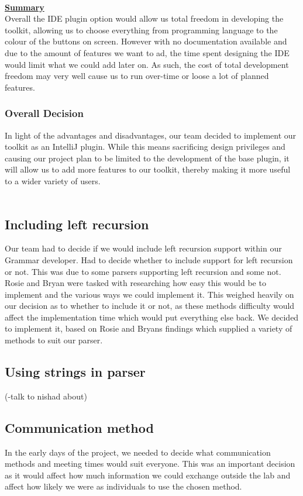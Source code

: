 \documentclass{l3proj}
\begin{document}
\\
\textbf {\underline{Summary}}\\
 Overall the IDE plugin option would allow us total freedom in developing the toolkit, allowing us to choose everything from programming language to the colour of the buttons on screen. However with no documentation available and due to the amount of features we want to ad, the time spent designing the IDE would limit what we could add later on. As such, the cost of total development freedom may very well cause us to run over-time or loose a lot of planned features.

\subsubsection{Overall Decision}
In light of the advantages and disadvantages, our team decided to implement our toolkit as an IntelliJ plugin. While this means sacrificing design privileges and causing our project plan to be limited to the development of the base plugin, it will allow us to add more features to our toolkit, thereby making it more useful to a wider variety of users.\\
\\ 

\subsection{Including left recursion}
Our team had to decide if we would include left recursion support within our Grammar developer. Had to decide whether to include support for left recursion or not. This was due to some parsers supporting left recursion and some not. Rosie and Bryan were tasked with researching how easy this would be to implement and the various ways we could implement it. This weighed heavily on our decision as to whether to include it or not, as these methods difficulty would affect the implementation time which would put everything else back. We decided to implement it, based on Rosie and Bryans findings which supplied a variety of methods to suit our parser.




\subsection{Using strings in parser}
(-talk to nishad about) %


\subsection{Communication method}
In the early days of the project, we needed to decide what communication methods and meeting times would suit everyone. This was an important decision as it would affect how much information we could exchange outside the lab and affect how likely we were as individuals to use the chosen method.\\
\end{document}

